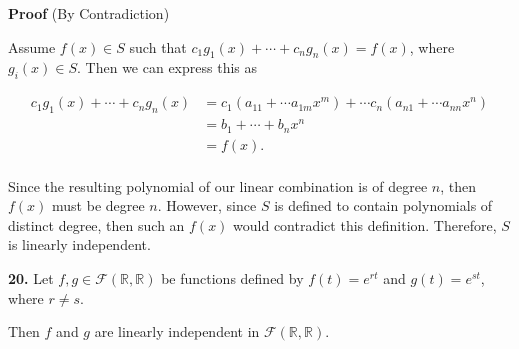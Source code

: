 \documentclass[12pt, a4paper]{article}
\begin{document}
\begin{addmargin}[1.4em]{1.4em}

    \noindent\textbf{Proof} (By Contradiction)
    
    \vspace{2mm}
    
    \noindent Assume $f(x)\in S$ such that $c_1g_1(x)+\cdots +c_ng_n(x)=f(x)$, where $g_i(x)\in S$. Then we can express this as
    
    \newpage
    
    \begin{equation*}
        \begin{split}
            c_1g_1(x)+\cdots +c_ng_n(x)& =c_1(a_{11}+\cdots a_{1m}x^m)+\cdots c_n(a_{n1}+\cdots a_{nn}x^n) \\
            & =b_1+\cdots +b_nx^n \\
            & =f(x). \\
        \end{split}
    \end{equation*}
    
    \noindent Since the resulting polynomial of our linear combination is of degree $n$, then $f(x)$ must be degree $n$. However, since $S$ is defined to contain polynomials of distinct degree, then such an $f(x)$ would contradict this definition. Therefore, $S$ is linearly independent.\hspace{121mm}\blacksquare

\end{addmargin}

\vspace{4mm}

\noindent\textbf{20.} Let $f,g\in\mathcal{F}(\mathbb{R},\mathbb{R})$ be functions defined by $f(t)=e^{rt}$ and $g(t)=e^{st}$, where $r\neq s$.\par Then $f$ and $g$ are linearly independent in $\mathcal{F}(\mathbb{R},\mathbb{R})$.

\vspace{4mm}
\end{document}
